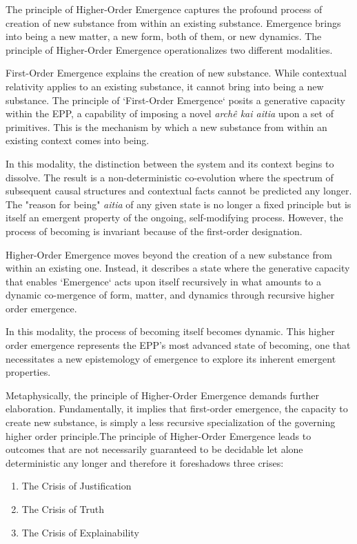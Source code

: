 The principle of Higher-Order Emergence captures the profound process of creation of new substance from within an existing substance. 
Emergence brings into being a new matter, a new form, both of them, or new dynamics. The principle of Higher-Order Emergence operationalizes two different modalities.  

First-Order Emergence explains the creation of new substance. While contextual relativity applies to an existing substance, it cannot bring into being a new substance. The principle of `First-Order Emergence` posits a generative capacity within the EPP, a capability of imposing a novel \textit{archê kai aitia} upon a set of primitives. This is the mechanism by which a new substance from within an existing context comes into being.

In this modality, the distinction between the system and its context begins to dissolve. The result is a non-deterministic co-evolution where the spectrum of subsequent causal structures and contextual facts cannot be predicted any longer. The "reason for being" \textit{aitia} of any given state is no longer a fixed principle but is itself an emergent property of the ongoing, self-modifying process. However, the process of becoming is invariant because of the first-order designation. 

Higher-Order Emergence moves beyond the creation of a new substance from within an existing one. Instead, it describes a state where the generative capacity that enables `Emergence` acts upon itself recursively in what amounts to a dynamic co-mergence of form, matter, and dynamics through recursive higher order emergence. 

In this modality, the process of becoming itself becomes dynamic. This higher order emergence represents the EPP's most advanced state of becoming, one that necessitates a new epistemology of emergence to explore its inherent emergent properties.


Metaphysically, the principle of Higher-Order Emergence demands further elaboration. Fundamentally, it implies that first-order emergence, the capacity to create new substance, is simply a less recursive specialization of the governing higher order principle.The principle of Higher-Order Emergence leads to outcomes that are not necessarily guaranteed to be decidable let alone deterministic any longer and therefore it foreshadows three crises:

\begin{enumerate}
	\item The Crisis of Justification
	\item The Crisis of Truth
	\item The Crisis of Explainability
\end{enumerate}


